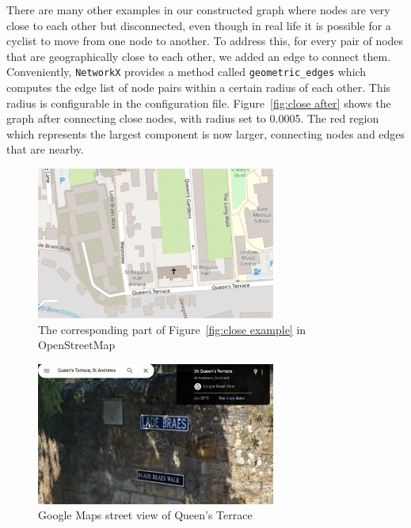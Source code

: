 \documentclass[12pt,a4paper]{report}
\begin{document}
There are many other examples in our constructed graph where nodes are very close to each other but disconnected, even though in real life it is possible for a cyclist to move from one node to another. To address this, for every pair of nodes that are geographically close to each other, we added an edge to connect them. Conveniently, \texttt{NetworkX} provides a method called \texttt{geometric\_edges} which computes the edge list of node pairs within a certain radius of each other. This radius is configurable in the configuration file. Figure~\ref{fig:close after} shows the graph after connecting close nodes, with radius set to 0.0005. The red region which represents the largest component is now larger, connecting nodes and edges that are nearby.

\begin{figure}[ht]
    \centering
    \includegraphics[width=0.7\textwidth]{diss_images/impl/osm_close.png}
    \caption{The corresponding part of Figure~\ref{fig:close example} in OpenStreetMap}
    \label{fig:osm close}
\end{figure}

\begin{figure}[ht]
    \centering
    \includegraphics[width=0.7\textwidth]{diss_images/impl/googlemap_cross.png}
    \caption{Google Maps street view of Queen's Terrace}
    \label{fig:google close}
\end{figure}
\end{document}
